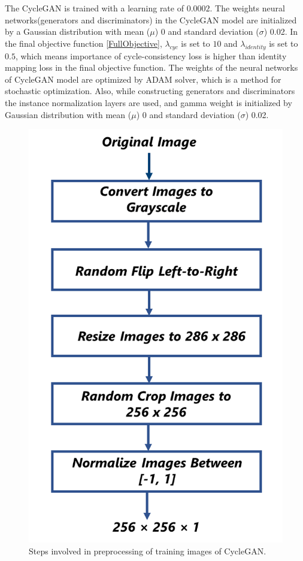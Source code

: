 The \ac{CycleGAN} is trained with a learning rate of $0.0002$. The weights neural networks(generators and discriminators) in the \ac{CycleGAN} model are initialized by a Gaussian distribution with mean ($\mu$) 0 and standard deviation ($\sigma$) 0.02. In the final objective function \ref{FullObjective}, $\lambda_{cyc}$ is set to $10$ and $\lambda_{identity}$ is set to $0.5$, which means importance of cycle-consistency loss is higher than identity mapping loss in the final objective function. The weights of the neural networks of \ac{CycleGAN} model are optimized by ADAM solver, which is a method for stochastic optimization\cite{kingma2017adam}. Also, while constructing generators and discriminators the instance normalization layers\cite{ulyanov2017instance} are used, and gamma weight is initialized by Gaussian distribution with mean ($\mu$) 0 and standard deviation ($\sigma$) 0.02.


\begin{figure}[H]
        \begin{center}
	    \includegraphics[scale=0.35]{images/Implementation/Preprocessing.png}
	    \caption[Steps involved in preprocessing of training images of \ac{CycleGAN}.]{Steps involved in preprocessing of training images of \ac{CycleGAN}.}
	    \label{fig:Preprocessing}
	    \end{center}
\end{figure}


